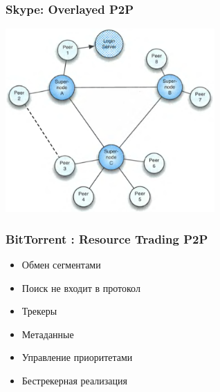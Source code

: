\documentclass[xetex,mathserif,serif]{beamer}
\begin{document}
    \begin{frame}
        \frametitle{Skype: Overlayed P2P}
        \begin{center}
            \includegraphics[width=0.6\textwidth]{skype.png}
        \end{center}
    \end{frame}

    \begin{frame}
        \frametitle{BitTorrent : Resource Trading P2P}
        \begin{itemize}
            \item Обмен сегментами
            \item Поиск не входит в протокол
            \item Трекеры
            \item Метаданные
            \item Управление приоритетами
            \item Бестрекерная реализация
        \end{itemize}
    \end{frame}
\end{document}
